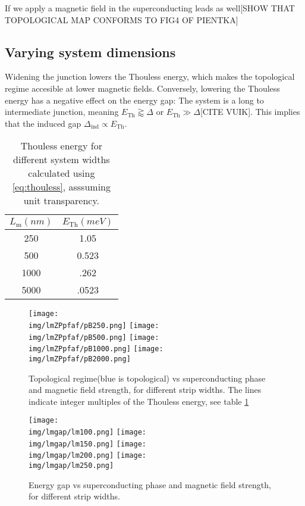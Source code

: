 \documentclass[10pt,a4paper]{article}
\newcommand{\img}{./images}
\begin{document}
		If we apply a magnetic field in the superconducting leads as well[SHOW THAT TOPOLOGICAL MAP CONFORMS TO FIG4 OF PIENTKA]
		
		
	\subsection{Varying system dimensions}
	 Widening the junction lowers the Thouless energy, which makes the topological regime accesible at lower magnetic fields. Conversely, lowering the Thouless energy has a negative effect on the energy gap: The system is a long to intermediate junction, meaning $E_\text{Th} \gtrapprox \Delta$ or $E_\text{Th} \gg \Delta$[CITE VUIK]. This implies that the induced gap $\Delta_\text{ind} \propto E_\text{Th}$.
	\begin{table}[H]
		\centering
		\begin{tabular}{|c|c|}
			\hline 
			$L_\text{m} (nm)$ & $E_\text{Th} (meV)$ \\ 
			\hline 
			250 & 1.05 \\ 
			\hline 
			500 & 0.523 \\ 
			\hline 
			1000 & .262 \\ 
			\hline 
			5000 & .0523 \\ 
			\hline 
		\end{tabular} 
		\caption{Thouless energy for different system widths calculated using \ref{eq:thouless}, asssuming unit transparency.}
		\label{table:thouless}
	\end{table}
	
	\begin{figure}[H]
		\texttt{[image: \\img/lmZPpfaf/pB250.png]}
		\texttt{[image: \\img/lmZPpfaf/pB500.png]}
		\texttt{[image: \\img/lmZPpfaf/pB1000.png]}
		\texttt{[image: \\img/lmZPpfaf/pB2000.png]}
		\caption{Topological regime(blue is topological) vs superconducting phase and magnetic field strength, for different strip widths. The lines indicate integer multiples of the Thouless energy, see table \ref{table:thouless}}
		\label{fig:lmZPpfaf}
	\end{figure}
	
	\begin{figure}[H]
		\texttt{[image: \\img/lmgap/lm100.png]}
		\texttt{[image: \\img/lmgap/lm150.png]}
		\texttt{[image: \\img/lmgap/lm200.png]}
		\texttt{[image: \\img/lmgap/lm250.png]}
		\caption{Energy gap vs superconducting phase and magnetic field strength, for different strip widths.}
		\label{fig:lmZPcurr}
	\end{figure}
\end{document}
